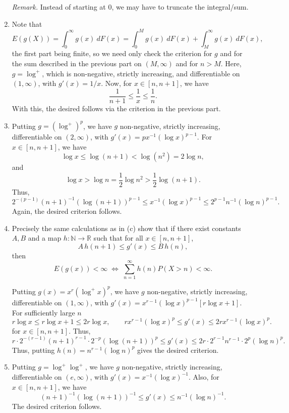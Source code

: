 \documentclass[10pt]{article}
\newcommand{\R}{\mathbb{R}}
\newcommand{\N}{\mathbb{N}}
\begin{document}
\begin{enumerate}
        \textit{Remark.} Instead of starting at $0$, we may have to truncate the
        integral/sum.


        \item Note that \[
            E(g(X)) = \int_0^\infty g(x) \:dF(x) = \int_0^M g(x) \:dF(x) +
            \int_M^\infty g(x) \:dF(x),
        \] the first part being finite, so we need only check the criterion for $g$
        and for the sum described in the previous part on $(M, \infty)$ and for $n >
        M$. Here, $g = \log^+$, which is non-negative, strictly increasing, and
        differentiable on $(1, \infty)$, with $g'(x) = 1 / x$. Now, for $x \in [n, n
        + 1]$, we have \[
            \frac{1}{n + 1} \leq \frac{1}{x} \leq \frac{1}{n}.
        \] With this, the desired follows via the criterion in the previous part.

        \item Putting $g = (\log^+)^p$, we have $g$ non-negative, strictly
        increasing, differentiable on $(2, \infty)$, with $g'(x) = p x^{-1}
        (\log{x})^{p - 1}$. For $x \in [n, n + 1]$, we have \[
            \log{x} \leq \log(n + 1) < \log(n^2) = 2\log{n},
        \] and \[
            \log{x} > \log{n} = \frac{1}{2} \log{n^2} > \frac{1}{2} \log(n + 1).
        \] Thus, \[
            2^{-(p - 1)} (n + 1)^{-1}(\log(n + 1))^{p - 1}
            \leq x^{-1}(\log{x})^{p - 1}
            \leq 2^{p - 1} n^{-1} (\log{n})^{p - 1}.
        \] Again, the desired criterion follows.

        \item Precisely the same calculations as in (c) show that if there exist
        constants $A, B$ and a map $h\colon \N \to \R$ such that for all $x \in [n, n
        + 1]$, \[
            A\, h(n + 1) \leq g'(x) \leq B\, h(n),
        \] then \[
            E(g(x)) < \infty \;\iff\; \sum_{n = 1}^\infty h(n) P(X > n) < \infty.
        \]

        Putting $g(x) = x^r (\log^+{x})^p$, we have $g$ non-negative, strictly
        increasing, differentiable on $(1, \infty)$, with $g'(x) = x^{r - 1}
        (\log{x})^{p - 1}[r\log{x} + 1]$. For sufficiently large $n$ \[
            r\log{x} \leq r\log{x} + 1 \leq 2r\log{x}, \qquad
            rx^{r - 1} (\log{x})^p \leq g'(x) \leq 2rx^{r - 1}(\log{x})^p.
        \] for $x \in [n, n + 1]$. Thus, \[
            r\cdot 2^{-(r - 1)} (n + 1)^{r - 1} \cdot 2^{-p} (\log(n + 1))^p
            \leq g'(x) \leq
            2r\cdot 2^{r - 1} n^{r - 1} \cdot 2^{p} (\log{n})^p.
        \] Thus, putting $h(n) = n^{r - 1} (\log{n})^p$ gives the desired criterion.


        \item Putting $g = \log^+\log^+$, we have $g$ non-negative, strictly
        increasing, differentiable on $(e, \infty)$, with $g'(x) = x^{-1}
        (\log{x})^{-1}$. Also, for $x \in [n, n + 1]$, we have \[
            (n + 1)^{-1} (\log(n + 1))^{-1} \leq g'(x) \leq n^{-1} (\log{n})^{-1}.
        \] The desired criterion follows.

    \end{enumerate}
\end{document}
